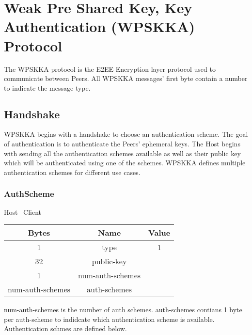 \section{Weak Pre Shared Key, Key Authentication (WPSKKA) Protocol}

The WPSKKA protocol is the E2EE Encryption layer protocol used to communicate between Peers. All WPSKKA messages'
first byte contain a number to indicate
the message type.\\

\subsection{Handshake}

WPSKKA begins with a handshake to choose an authentication scheme. The goal of authentication is to authenticate the Peers' ephemeral keys. The Host begins with sending all the authentication schemes available as well as their public key which will be authenticated using one of the schemes. WPSKKA defines multiple authentication schemes for different use cases.

\subsubsection{AuthScheme}

\begin{center}
    Host \textrightarrow\ Client\\
    \begin{tabular}{|c|c|c|}
        \hline
        \textbf{Bytes}   & \textbf{Name}    & \textbf{Value} \\
        \hline
        1                & type             & 1              \\
        \hline
        32               & public-key       &                \\
        \hline
        1                & num-auth-schemes &                \\
        \hline
        num-auth-schemes & auth-schemes     &                \\
        \hline
    \end{tabular}
\end{center}

num-auth-schemes is the number of auth schemes. auth-schemes contians 1 byte per auth-scheme to indidcate which authentication scheme is available. Authentication schmes are defined below.\\

